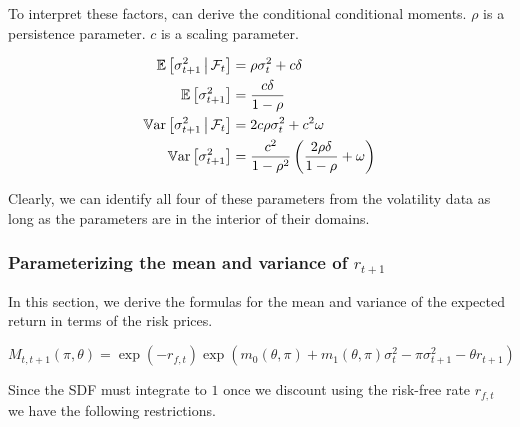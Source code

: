 \documentclass[11pt, letterpaper, twoside, final]{article}
\begin{document}
To interpret these factors, can derive the conditional conditional moments. 
$\rho$ is a persistence parameter.
$c$ is a scaling parameter.


\begin{align}
    \operatorname{\mathbb{E}}\left[\sigma^2_{t+1} \,\middle\vert\, \mathcal{F}_t \right]  &= \rho \sigma^2_{t}  + c \delta\\
    \operatorname{\mathbb{E}}\left[\sigma^2_{t+1}\right]  &= \frac{c \delta}{1 - \rho} \\
    \operatorname{\mathbb{V}ar}\left[\sigma^2_{t+1} \,\middle\vert\, \mathcal{F}_t \right]  &=  2 c \rho \sigma^2_{t}  + c^2 \omega \\
    \operatorname{\mathbb{V}ar}\left[\sigma^2_{t+1} \right]  &=  \frac{c^2}{1 - \rho^2} \left(\frac{2 \rho \delta}{1 - \rho}  +
        \omega \right) 
\end{align}

Clearly, we can identify all four of these parameters from the volatility data as long as the parameters are in
the interior of their domains.

\subsubsection{\texorpdfstring{Parameterizing the mean and variance of $r_{t+1}$}{Parameterizing the return's
mean and variance}}\label{sec:deriving_sdf_functions}


In this section, we derive the formulas for the mean and variance of the expected return in terms of the risk
prices.

\begin{equation}
    M_{t,t+1}(\pi, \theta) = \exp(-r_{f,t}) \exp \left( m_0(\theta, \pi) + m_1(\theta, \pi) \sigma_t^2 - \pi
    \sigma^2_{t+1} - \theta r_{t+1}\right)
\end{equation}

Since the SDF must integrate to $1$ once we discount using the risk-free rate $r_{f,t}$\, we have the following
restrictions.
\end{document}
